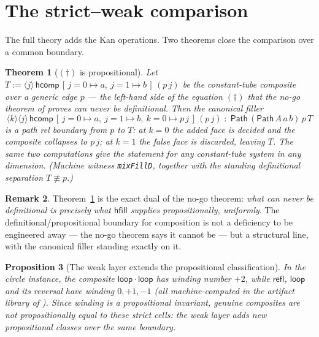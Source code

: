 \documentclass[11pt]{amsart}
\newtheorem{thm}{Theorem}[section]
\newtheorem{prop}[thm]{Proposition}
\theoremstyle{definition}
\newtheorem{rem}[thm]{Remark}
\newcommand{\nconv}{\not\equiv}
\newcommand{\refl}{\mathsf{refl}}
\newcommand{\Path}{\mathsf{Path}}
\newcommand{\hcomp}{\mathsf{hcomp}}
\newcommand{\hfillop}{\mathsf{hfill}}
\begin{document}
\section{The strict--weak comparison}
\label{sec:comparison}

The full theory adds the Kan operations.  Two theorems close the
comparison over a common boundary.

\begin{thm}[$(\dagger)$ is propositional]\label{thm:dagger}
  Let $T := \langle j \rangle\,
  \hcomp\,[\,j{=}0 \mapsto a,\ j{=}1 \mapsto b\,]\,(p\,j)$ be the
  constant-tube composite over a generic edge $p$ --- the left-hand
  side of the equation $(\dagger)$ that the no-go theorem of
  \cite{Const} proves can never be definitional.  Then the
  canonical filler
  \[
    \langle k \rangle \langle j \rangle\,
    \hcomp\,[\,j{=}0 \mapsto a,\ j{=}1 \mapsto b,\
    k{=}0 \mapsto p\,j\,]\,(p\,j)
    \;:\; \Path\,(\Path\,A\,a\,b)\,p\,T
  \]
  is a path rel boundary from $p$ to $T$: at $k = 0$ the added face
  is decided and the composite collapses to $p\,j$; at $k = 1$ the
  false face is discarded, leaving $T$.  The same two computations
  give the statement for any constant-tube system in any dimension.
  (Machine witness \texttt{mixFillD}, together with the standing
  definitional separation $T \nconv p$.)
\end{thm}

\begin{rem}
  Theorem~\ref{thm:dagger} is the exact dual of the no-go theorem:
  \emph{what can never be definitional is precisely what
  $\hfillop$ supplies propositionally, uniformly}.  The
  definitional/propositional boundary for composition is not a
  deficiency to be engineered away --- the no-go theorem says it
  cannot be --- but a structural line, with the canonical filler
  standing exactly on it.
\end{rem}

\begin{prop}[The weak layer extends the propositional
  classification]\label{prop:winding}
  In the circle instance, the composite
  $\mathsf{loop} \cdot \mathsf{loop}$ has winding number $+2$,
  while $\refl$, $\mathsf{loop}$ and its reversal have winding
  $0, +1, -1$ (all machine-computed in the artifact library of
  \cite{Const}).  Since winding is a propositional invariant,
  genuine composites are not propositionally equal to these strict
  cells: the weak layer adds new propositional classes over the
  same boundary.
\end{prop}
\end{document}
